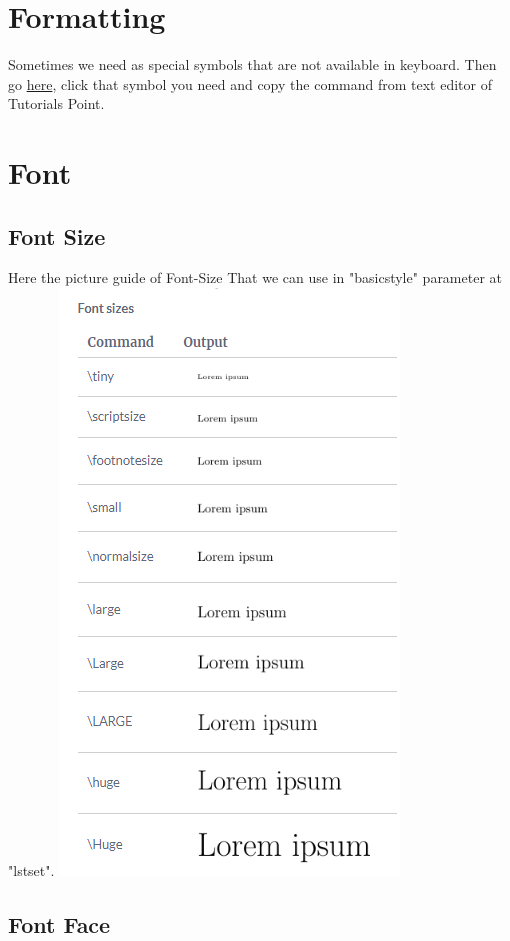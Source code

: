 \section{Formatting}
Sometimes we need as special symbols that are not available in keyboard. Then go \href{https://www.tutorialspoint.com/online_latex_editor.php}{{\color{blue}here}}, click that symbol you need and copy the command from text editor of {\color{red}Tutorials Point}.

\section{Font}
\subsection{Font Size}
Here the picture guide of Font-Size That we can use in "basicstyle" parameter at "lstset".
\includegraphics[scale=1]{../Font size.png}
\subsection{Font Face}

